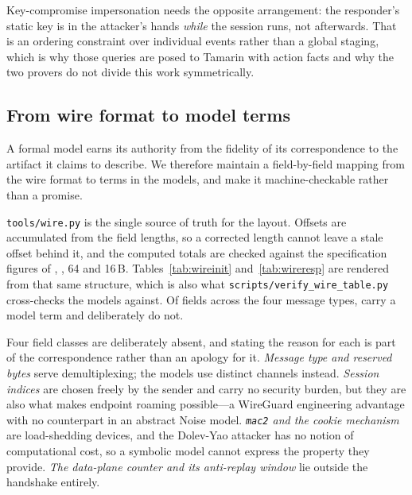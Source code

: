  Key-compromise impersonation needs
the opposite arrangement: the responder's static key is in the attacker's
hands \emph{while} the session runs, not afterwards. That is an ordering
constraint over individual events rather than a global staging, which is why
those queries are posed to Tamarin with action facts and why the two provers
do not divide this work symmetrically.

\subsection{From wire format to model terms}

A formal model earns its authority from the fidelity of its correspondence to
the artifact it claims to describe. We therefore maintain a field-by-field
mapping from the wire format to terms in the models, and make it
machine-checkable rather than a promise.

 \texttt{tools/wire.py} is the
single source of truth for the layout. Offsets are accumulated from the field
lengths, so a corrected length cannot leave a stale offset behind it, and the
computed totals are checked against the specification figures of
\wgInitBytes, \wgRespBytes, 64 and 16\,B. Tables~\ref{tab:wireinit}
and~\ref{tab:wireresp} are rendered from that same structure, which is also
what \texttt{scripts/verify\_wire\_table.py} cross-checks the models against.
Of \wgFields{} fields across the four message types, \wgFieldsModelled{} carry
a model term and \wgFieldsUnmodelled{} deliberately do not.

\begin{table}[t]
\centering
\caption{Handshake initiation, \wgInitBytes\,B. Offsets are derived from
lengths; ``model term'' names the corresponding term in the shared ProVerif
core, and a dash marks a field deliberately outside the models.}
\label{tab:wireinit}
\footnotesize

\end{table}

\begin{table}[t]
\centering
\caption{Handshake response, \wgRespBytes\,B. Note that \texttt{mac1} here is
keyed by the \emph{initiator's} static public value, which is what makes
identity hiding conditional.}
\label{tab:wireresp}
\footnotesize

\end{table}

 Four field classes are deliberately
absent, and stating the reason for each is part of the correspondence rather
than an apology for it. \emph{Message type and reserved bytes} serve
demultiplexing; the models use distinct channels instead. \emph{Session
indices} are chosen freely by the sender and carry no security burden, but
they are also what makes endpoint roaming possible---a WireGuard engineering
advantage with no counterpart in an abstract Noise model. \emph{\texttt{mac2}
and the cookie mechanism} are load-shedding devices, and the Dolev-Yao
attacker has no notion of computational cost, so a symbolic model cannot
express the property they provide. \emph{The data-plane counter and its
anti-replay window} lie outside the handshake entirely.

